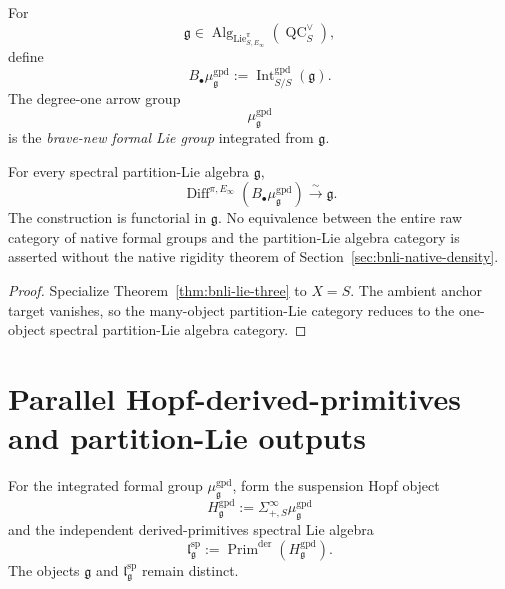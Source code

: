 \begin{definition}
\label{def:bnli-formal-group}
For
\[
    \mathfrak g
    \in
    \operatorname{Alg}_{\operatorname{Lie}^{\pi}_{S,E_\infty}}
    (\operatorname{QC}^{\vee}_S),
\]
define
\[
    B_\bullet\mu^{\mathrm{gpd}}_{\mathfrak g}
    :=
    \operatorname{Int}^{\mathrm{gpd}}_{S/S}(\mathfrak g).
\]
The degree-one arrow group
\[
\boxed{
    \mu^{\mathrm{gpd}}_{\mathfrak g}}
\]
is the \emph{brave-new formal Lie group} integrated from $\mathfrak g$.
\end{definition}

\begin{theorem}
\label{thm:bnli-one-object-lie-three}
For every spectral partition-Lie algebra $\mathfrak g$,
\[
\boxed{
    \operatorname{Diff}^{\pi,E_\infty}
    \left(
      B_\bullet\mu^{\mathrm{gpd}}_{\mathfrak g}
    \right)
    \xrightarrow{\sim}
    \mathfrak g.}
\]
The construction is functorial in $\mathfrak g$.  No equivalence between the
entire raw category of native formal groups and the partition-Lie algebra
category is asserted without the native rigidity theorem of
Section~\ref{sec:bnli-native-density}.
\end{theorem}

\begin{proof}
Specialize Theorem~\ref{thm:bnli-lie-three} to $X=S$.  The ambient anchor
target vanishes, so the many-object partition-Lie category reduces to the
one-object spectral partition-Lie algebra category.
\end{proof}

\section{Parallel Hopf-derived-primitives and partition-Lie outputs}
\label{sec:bnli-hopf-comparison}

For the integrated formal group $\mu^{\mathrm{gpd}}_{\mathfrak g}$, form the
suspension Hopf object
\[
    H^{\mathrm{gpd}}_{\mathfrak g}
    :=
    \Sigma^\infty_{+,S}\mu^{\mathrm{gpd}}_{\mathfrak g}
\]
and the independent derived-primitives spectral Lie algebra
\[
    \mathfrak l^{\mathrm{sp}}_{\mathfrak g}
    :=
    \operatorname{Prim}^{\mathrm{der}}
    \left(
      H^{\mathrm{gpd}}_{\mathfrak g}
    \right).
\]
The objects $\mathfrak g$ and
$\mathfrak l^{\mathrm{sp}}_{\mathfrak g}$ remain distinct.

